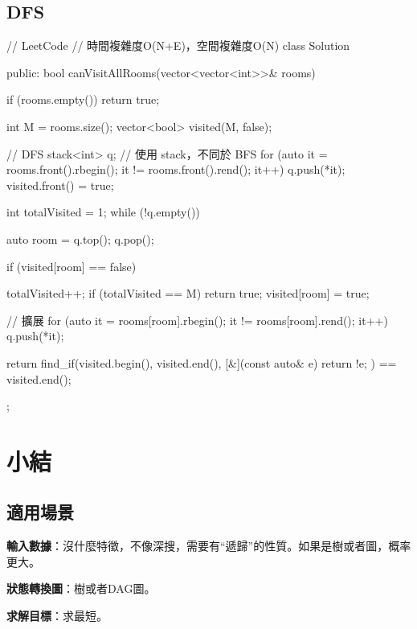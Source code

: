 \subsection{DFS}
\begin{Code}
// LeetCode
// 時間複雜度O(N+E)，空間複雜度O(N)
class Solution {
public:
    bool canVisitAllRooms(vector<vector<int>>& rooms) {
        if (rooms.empty()) return true;

        int M = rooms.size();
        vector<bool> visited(M, false);

        // DFS
        stack<int> q; // 使用 stack，不同於 BFS
        for (auto it = rooms.front().rbegin(); it != rooms.front().rend(); it++)
            q.push(*it);
        visited.front() = true;

        int totalVisited = 1;
        while (!q.empty())
        {
            auto room = q.top();
            q.pop();

            if (visited[room] == false)
            {
                totalVisited++;
                if (totalVisited == M) return true;
                visited[room] = true;

                // 擴展
                for (auto it = rooms[room].rbegin(); it != rooms[room].rend(); it++)
                    q.push(*it);
            }
        }

        return find_if(visited.begin(), visited.end(), [&](const auto& e){ return !e; })
                       == visited.end();
    }
};
\end{Code}
\section{小結} %
\label{sec:bfs-template}


\subsection{適用場景}

\textbf{輸入數據}：沒什麼特徵，不像深搜，需要有“遞歸”的性質。如果是樹或者圖，概率更大。

\textbf{狀態轉換圖}：樹或者DAG圖。

\textbf{求解目標}：求最短。



